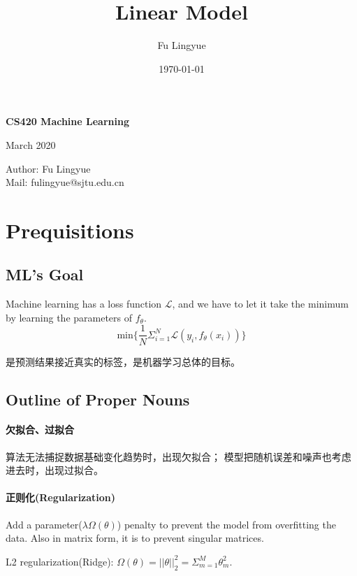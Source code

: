 

\title{Linear Model}
\author{Fu Lingyue}
\date{\today}


  \pagestyle{main}

\begin{center}
    \Huge
    \textbf{CS420 Machine Learning }
\end{center}

\begin{center}
    \par March 2020
    \par Author: Fu Lingyue  \\Mail: fulingyue@sjtu.edu.cn
\end{center}

\tableofcontents
\newpage

\section{Prequisitions}
\subsection{ML's Goal}
Machine learning has a loss function $\mathcal{L}$, 
and we have to let it take the minimum by learning the parameters of $f_\theta$.
$$ 
\mathrm{min} \{\frac{1}{N} \Sigma_{i = 1}^N \mathcal{L} (y_i,f_\theta(x_i))\}
$$

是预测结果接近真实的标签，是机器学习总体的目标。

\subsection{Outline of Proper Nouns}
\paragraph{欠拟合、过拟合}
算法无法捕捉数据基础变化趋势时，出现欠拟合；
模型把随机误差和噪声也考虑进去时，出现过拟合。

\paragraph{正则化(Regularization)} Add a parameter($\lambda \Omega(\theta)$) penalty to prevent the model from overfitting the data. Also in matrix form, it is to prevent singular matrices.

L2 regularization(Ridge): $\Omega(\theta) = ||\theta||^2_2 = \Sigma_{m=1}^M\theta_m^2$.

